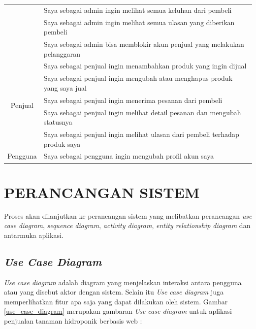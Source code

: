 \begin{table}[H]
\begin{center}
\begin{tabular}{|c| m{12cm} |}
	\cline{2-2}& {\footnotesize Saya sebagai admin ingin melihat semua keluhan dari pembeli}\\
	\cline{2-2}& {\footnotesize Saya sebagai admin ingin melihat semua ulasan yang diberikan pembeli}\\
	\cline{2-2}& {\footnotesize Saya sebagai admin bisa memblokir akun penjual yang melakukan pelanggaran}\\
	\hline
	\multirow{5}{*}{\footnotesize Penjual} & {\footnotesize Saya sebagai penjual ingin menambahkan produk yang ingin dijual}\\
	\cline{2-2}& {\footnotesize Saya sebagai penjual ingin mengubah atau menghapus produk yang saya jual}\\
	\cline{2-2}& {\footnotesize Saya sebagai penjual ingin menerima pesanan dari pembeli}\\
	\cline{2-2}& {\footnotesize Saya sebagai penjual ingin melihat detail pesanan dan mengubah statusnya}\\
	\cline{2-2}& {\footnotesize Saya sebagai penjual ingin melihat ulasan dari pembeli terhadap produk saya}\\
	\hline
	{\footnotesize Pengguna} & {\footnotesize Saya sebagai pengguna ingin mengubah profil akun saya}\\
	\hline
	\end{tabular}
	\end{center}
\end{table}

\section{\uppercase{Perancangan Sistem}}
Proses akan dilanjutkan ke perancangan sistem yang melibatkan perancangan \textit{use case diagram}, \textit{sequence diagram}, \textit{activity diagram}, \textit{entity relationship diagram} dan antarmuka aplikasi. 

\subsection{\textit{Use Case Diagram}}
\textit{Use case diagram} adalah diagram yang menjelaskan interaksi antara pengguna atau yang disebut aktor dengan sistem. Selain itu \textit{Use case diagram} juga memperlihatkan fitur apa saja yang dapat dilakukan oleh sistem. Gambar \ref*{use_case_diagram} merupakan gambaran \textit{Use case diagram} untuk aplikasi penjualan tanaman hidroponik berbasis web :

